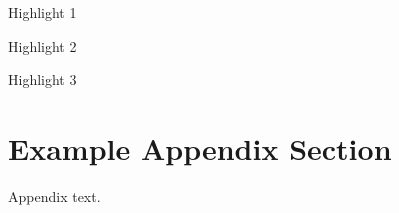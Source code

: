 \documentclass[preprint,12pt,authoryear]{elsarticle}
\begin{document}
\begin{frontmatter}

  \title{\myTitle} %


  \author[1]{MY NAME} %
  \author[]{CORRESPONDING AUTHOR NAME }

  \begin{abstract}
    Abstract text.
  \end{abstract}

  \begin{graphicalabstract}
  \end{graphicalabstract}
 
  \begin{highlights}
    \item Highlight 1
    \item Highlight 2
    \item Highlight 3
  \end{highlights}

  \begin{keyword}



  \end{keyword}

\end{frontmatter}











\appendix
\section{Example Appendix Section}
\label{app1}

Appendix text.



\end{document}
